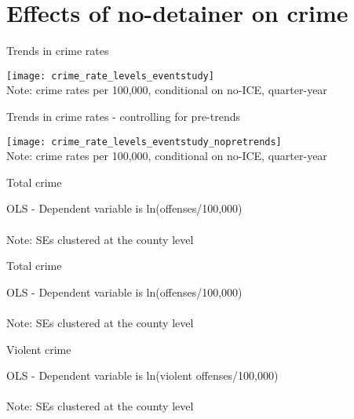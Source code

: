 \documentclass[xcolor=pdftex,dvipsnames,table]{beamer}
\newcommand{\tablesfolder}{/Users/bbiasi/Dropbox/Research/sanctuaries/sanctuaries_git/tex/tables}
\begin{document}
\section{Effects of no-detainer on crime}
\begin{frame}{Trends in crime rates}
\begin{center}
\texttt{[image: crime\_rate\_levels\_eventstudy]}\\
\footnotesize{Note: crime rates per 100,000, conditional on no-ICE, quarter-year}
\end{center}
\end{frame}

\begin{frame}{Trends in crime rates - controlling for pre-trends}
\begin{center}
\texttt{[image: crime\_rate\_levels\_eventstudy\_nopretrends]}\\
\footnotesize{Note: crime rates per 100,000, conditional on no-ICE, quarter-year}
\end{center}
\end{frame}

\begin{frame}{Total crime}
\footnotesize
\begin{center}
OLS - Dependent variable is ln(offenses/100,000)\\

\\\footnotesize{Note: SEs clustered at the county level}
\end{center}
\end{frame}

\begin{frame}{Total crime}
\footnotesize
\begin{center}
OLS - Dependent variable is ln(offenses/100,000)\\

\\\footnotesize{Note: SEs clustered at the county level}
\end{center}
\end{frame}

\begin{frame}{Violent crime}
\footnotesize
\begin{center}
OLS - Dependent variable is ln(violent offenses/100,000)\\

\\\footnotesize{Note: SEs clustered at the county level}
\end{center}
\end{frame}
\end{document}
